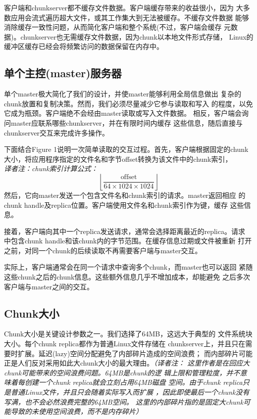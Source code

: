 客户端和chunkserver都不缓存文件数据。客户端缓存带来的收益很小，因为
大多数应用会流式遍历超大文件，或其工作集大到无法被缓存。不缓存文件数据
能够消除缓存一致性问题，从而简化客户端和整个系统(不过，客户端会缓存
元数据)。chunkserver也无需缓存文件数据，因为chunk以本地文件形式存储，
Linux的缓冲区缓存已经会将频繁访问的数据保留在内存中。

\subsection{单个主控(master)服务器}
单个master极大简化了我们的设计，并使master能够利用全局信息做出
复杂的chunk放置和复制决策。然而，我们必须尽量减少它参与读取和写入
的程度，以免它成为瓶颈。客户端绝不会经由master读取或写入文件数据。
相反，客户端会询问master应联系哪些chunkserver，并在有限时间内缓存
这些信息，随后直接与chunkserver交互来完成许多操作。

下面结合Figure 1说明一次简单读取的交互过程。首先，客户端根据固定的chunk
大小，将应用程序指定的文件名和字节offset转换为该文件中的chunk索引，
\\\emph{
译者注：chunk索引计算公式：
\[
\left\lfloor \frac{\text{offset}}{64 \times 1024 \times 1024} \right\rfloor
\]}
然后，它向master发送一个包含文件名和chunk索引的请求。master返回相应
的chunk handle及replica位置。客户端使用文件名和chunk索引作为键，缓存
这些信息。

接着，客户端向其中一个replica发送请求，通常会选择距离最近的replica。请求
中包含chunk handle和该chunk内的字节范围。在缓存信息过期或文件被重新
打开之前，对同一个chunk的后续读取不再需要客户端与master交互。

实际上，客户端通常会在同一个请求中查询多个chunk，而master也可以返回
紧随这些chunk之后的chunk信息。这些额外信息几乎不增加成本，却能避免
之后多次客户端与master之间的交互。

\subsection{Chunk大小}
Chunk大小是关键设计参数之一。我们选择了64MB，这远大于典型的
文件系统块大小。每个chunk replica都作为普通Linux文件存储在
chunkserver上，并且只在需要时扩展。延迟(lazy)空间分配避免了内部碎片造成的空间浪费；
而内部碎片可能正是人们反对采用如此大chunk大小的最大理由。\emph{（译者注：
这里作者是在回应大chunk可能带来的空间浪费问题。64MB是chunk的逻
辑上限和管理粒度，并不意味着每创建一个chunk replica就会立刻占用64MB磁盘
空间。由于chunk replica只是普通Linux文件，并且只会随着实际写入而扩展
，因此即使最后一个chunk没有写满，也不会必然浪费完整的64MB空间。
这里的内部碎片指的是固定大chunk可能导致的未使用空间浪费，而不是内存碎片）}

